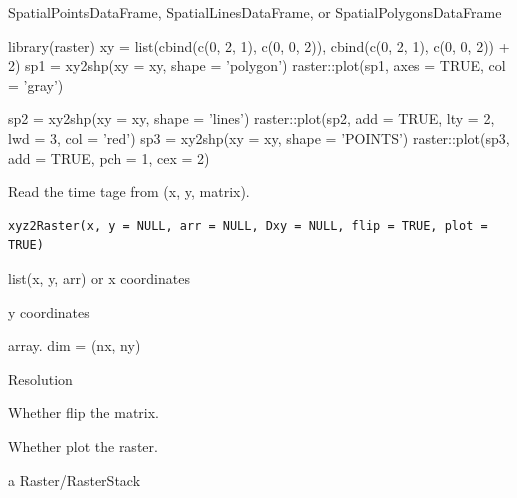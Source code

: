 \documentclass[a4paper]{book}
\begin{document}
%
\begin{Value}
SpatialPointsDataFrame, SpatialLinesDataFrame, or SpatialPolygonsDataFrame
\end{Value}
%
\begin{Examples}
\begin{ExampleCode}
library(raster)
xy = list(cbind(c(0, 2, 1), c(0, 0, 2)),  cbind(c(0, 2, 1), c(0, 0, 2)) + 2)
sp1 = xy2shp(xy = xy, shape = 'polygon')
raster::plot(sp1, axes = TRUE, col = 'gray')

sp2 = xy2shp(xy = xy, shape = 'lines')
raster::plot(sp2, add = TRUE, lty = 2, lwd = 3, col = 'red')
sp3 = xy2shp(xy = xy, shape = 'POINTS')
raster::plot(sp3, add = TRUE, pch = 1, cex = 2)

\end{ExampleCode}
\end{Examples}
%
\begin{Description}\relax
Read the time tage from (x, y, matrix).
\end{Description}
%
\begin{Usage}
\begin{verbatim}
xyz2Raster(x, y = NULL, arr = NULL, Dxy = NULL, flip = TRUE, plot = TRUE)
\end{verbatim}
\end{Usage}
%
\begin{Arguments}
\begin{ldescription}
\item[\code{x}] list(x, y, arr) or x coordinates

\item[\code{y}] y coordinates

\item[\code{arr}] array. dim = (nx, ny)

\item[\code{Dxy}] Resolution

\item[\code{flip}] Whether flip the matrix.

\item[\code{plot}] Whether plot the raster.
\end{ldescription}
\end{Arguments}
%
\begin{Value}
a Raster/RasterStack
\end{Value}
\printindex{}
\end{document}
